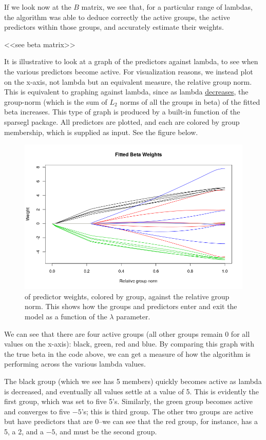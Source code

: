 \documentclass[12pt]{article}
\begin{document}
If we look now at the $B$ matrix, we see that, for a particular range of lambdas, the algorithm was able to deduce correctly the active groups, the active predictors within those groups, and accurately estimate their weights.

<<see beta matrix>>

It is illustrative to look at a graph of the predictors against lambda, to see when the various predictors become active. For visualization reasons, we instead plot on the x-axis, not lambda but an equivalent measure, the relative group norm. This is equivalent to graphing against lambda, since as lambda \underline{decreases}, the group-norm (which is the sum of $L_2$ norms of all the groups in beta) of the fitted beta increases. This type of graph is produced by a built-in function of the sparsegl package. All predictors are plotted, and each are colored by group membership, which is supplied as input. See the figure below.


\begin{figure}[tb!]
\centering
\includegraphics[scale=0.5]{fitted_beta_weights.png}
 of predictor weights, colored by group, against the relative group norm. This shows how the groups and predictors enter and exit the model as a function of the $\lambda$ parameter.
\label{fig:colorWeights}
\end{figure}

We can see that there are four active groups (all other groups remain 0 for all values on the x-axis): black, green, red and blue. By comparing this graph with the true beta in the code above, we can get a measure of how the algorithm is performing across the various lambda values.

The black group (which we see has 5 members) quickly becomes active as lambda is decreased, and eventually all values settle at a value of 5. This is evidently the first group, which was set to five 5's. Similarly, the green group becomes active and converges to five $-5$'s; this is third group. The other two groups are active but have predictors that are 0--we can see that the red group, for instance, has a 5, a 2, and a $-5$, and must be the second group.
\end{document}
